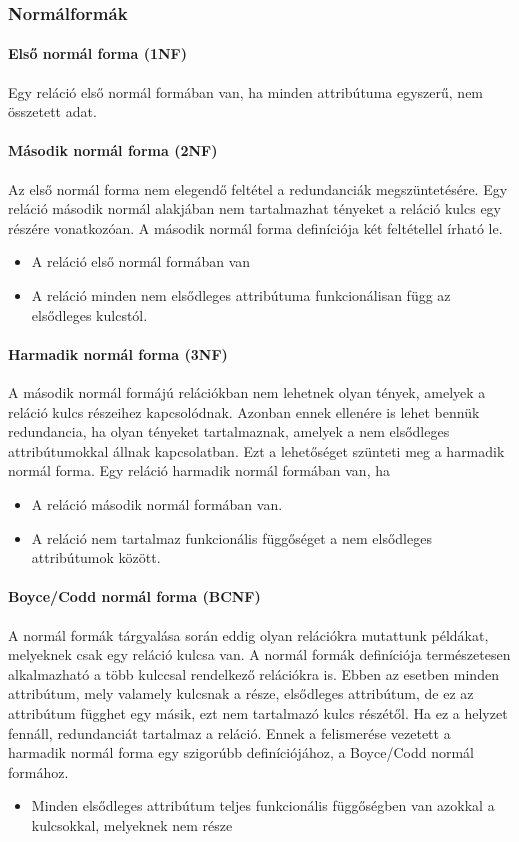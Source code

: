 \subsubsection{Normálformák}
\paragraph{Első normál forma (1NF)}
Egy reláció első normál formában van, ha minden attribútuma egyszerű, nem összetett adat.
\paragraph{Második normál forma (2NF)}
Az első normál forma nem elegendő feltétel a redundanciák megszüntetésére. Egy reláció második normál alakjában nem tartalmazhat tényeket a reláció kulcs egy részére vonatkozóan. A második normál forma definíciója két feltétellel írható le.
\begin{itemize}[nosep]
	\item A reláció első normál formában van
	\item A reláció minden nem elsődleges attribútuma funkcionálisan függ az elsődleges kulcstól.
\end{itemize}
\paragraph{Harmadik normál forma (3NF)}
A második normál formájú relációkban nem lehetnek olyan tények, amelyek a reláció kulcs részeihez kapcsolódnak. Azonban ennek ellenére is lehet bennük redundancia, ha olyan tényeket tartalmaznak, amelyek a nem elsődleges attribútumokkal állnak kapcsolatban. Ezt a lehetőséget szünteti meg a harmadik normál forma. Egy reláció harmadik normál formában van, ha
\begin{itemize}[nosep]
	\item A reláció második normál formában van.
	\item A reláció nem tartalmaz funkcionális függőséget a nem elsődleges attribútumok között.
\end{itemize}
\paragraph{Boyce/Codd normál forma (BCNF)}
A normál formák tárgyalása során eddig olyan relációkra mutattunk példákat, melyeknek csak egy reláció kulcsa van. A normál formák definíciója természetesen alkalmazható a több kulccsal rendelkező relációkra is. Ebben az esetben minden attribútum, mely valamely kulcsnak a része, elsődleges attribútum, de ez az attribútum függhet egy másik, ezt nem tartalmazó kulcs részétől. Ha ez a helyzet fennáll, redundanciát tartalmaz a reláció. Ennek a felismerése vezetett a harmadik normál forma egy szigorúbb definíciójához, a Boyce/Codd normál formához.
\begin{itemize}[nosep]
	\item Minden elsődleges attribútum teljes funkcionális függőségben van azokkal a kulcsokkal, melyeknek nem része
\end{itemize}

